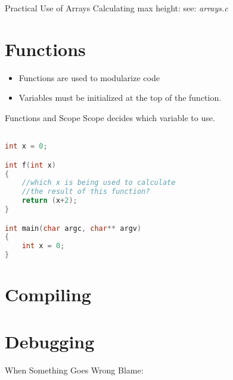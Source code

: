 \documentclass[main.tex]{subfile}
\begin{document}
\begin{frame}[fragile]{Practical Use of Arrays}
	Calculating max height: see: \textit{arrays.c}
\end{frame}


\section{Functions} 
\label{sec:functions}

\begin{frame}
	\begin{itemize}
		\item Functions are used to modularize code
		\item Variables must be initialized at the top of the function.
	\end{itemize}
\end{frame}

\begin{frame}[fragile]{Functions and Scope}
Scope decides which variable to use.

	\begin{lstlisting}[language=c]

int x = 0;

int f(int x)
{
	//which x is being used to calculate 
	//the result of this function?
	return (x+2);
}

int main(char argc, char** argv)
{
	int x = 0;
}

	\end{lstlisting}
\end{frame}


\section{Compiling} 
\label{sec:compiling}


\section{Debugging} 
\label{sec:debugging}

\begin{frame}{When Something Goes Wrong Blame:}

	\begin{itemize}
	\end{itemize}

\end{frame}
\end{document}
